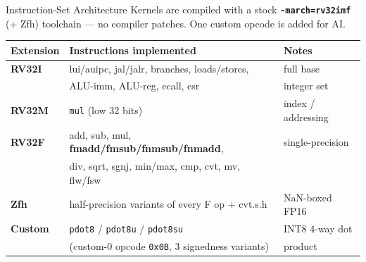 \documentclass[aspectratio=169,11pt]{beamer}
\newcommand{\hl}[1]{{\color{simtixaccent}\textbf{#1}}}
\newcommand{\navy}[1]{{\color{simtixblue}\textbf{#1}}}
\begin{document}
\begin{frame}{Instruction-Set Architecture}
  Kernels are compiled with a stock \hl{\texttt{-march=rv32imf}} (+ Zfh) toolchain --- no
  compiler patches. One custom opcode is added for AI.
  \vspace{0.3em}
  \begin{center}\small
  \begin{tabular}{@{}lll@{}}
    \toprule
    Extension & Instructions implemented & Notes \\
    \midrule
    \navy{RV32I} & lui/auipc, jal/jalr, branches, loads/stores, & full base \\
                 & ALU-imm, ALU-reg, ecall, csr & integer set \\
    \navy{RV32M} & \texttt{mul} (low 32 bits) & index / addressing \\
    \navy{RV32F} & add, sub, mul, \textbf{fmadd/fmsub/fnmsub/fnmadd}, & single-precision \\
                 & div, sqrt, sgnj, min/max, cmp, cvt, mv, flw/fsw & \\
    \navy{Zfh}   & half-precision variants of every F op + cvt.s.h & NaN-boxed FP16 \\
    \midrule
    \navy{Custom} & \texttt{pdot8} / \texttt{pdot8u} / \texttt{pdot8su} & INT8 4-way dot \\
                  & (custom-0 opcode \texttt{0x0B}, 3 signedness variants) & product \\
    \bottomrule
  \end{tabular}
  \end{center}
\end{frame}
\end{document}
